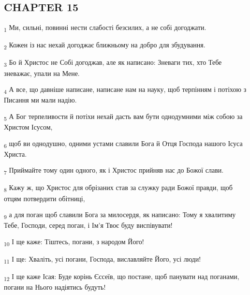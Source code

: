 \subsection{CHAPTER 15}
\begin{tcolorbox}
\textsubscript{1} Ми, сильні, повинні нести слабості безсилих, а не собі догоджати.
\end{tcolorbox}
\begin{tcolorbox}
\textsubscript{2} Кожен із нас нехай догоджає ближньому на добро для збудування.
\end{tcolorbox}
\begin{tcolorbox}
\textsubscript{3} Бо й Христос не Собі догоджав, але як написано: Зневаги тих, хто Тебе зневажає, упали на Мене.
\end{tcolorbox}
\begin{tcolorbox}
\textsubscript{4} А все, що давніше написане, написане нам на науку, щоб терпінням і потіхою з Писання ми мали надію.
\end{tcolorbox}
\begin{tcolorbox}
\textsubscript{5} А Бог терпеливости й потіхи нехай дасть вам бути однодумними між собою за Христом Ісусом,
\end{tcolorbox}
\begin{tcolorbox}
\textsubscript{6} щоб ви однодушно, одними устами славили Бога й Отця Господа нашого Ісуса Христа.
\end{tcolorbox}
\begin{tcolorbox}
\textsubscript{7} Приймайте тому один одного, як і Христос прийняв нас до Божої слави.
\end{tcolorbox}
\begin{tcolorbox}
\textsubscript{8} Кажу ж, що Христос для обрізаних став за служку ради Божої правди, щоб отцям потвердити обітниці,
\end{tcolorbox}
\begin{tcolorbox}
\textsubscript{9} а для поган щоб славили Бога за милосердя, як написано: Тому я хвалитиму Тебе, Господи, серед поган, і Ім'я Твоє буду виспівувати!
\end{tcolorbox}
\begin{tcolorbox}
\textsubscript{10} І ще каже: Тіштесь, погани, з народом Його!
\end{tcolorbox}
\begin{tcolorbox}
\textsubscript{11} І ще: Хваліть, усі погани, Господа, виславляйте Його, усі люди!
\end{tcolorbox}
\begin{tcolorbox}
\textsubscript{12} І ще каже Ісая: Буде корінь Єссеїв, що постане, щоб панувати над поганами, погани на Нього надіятись будуть!
\end{tcolorbox}
